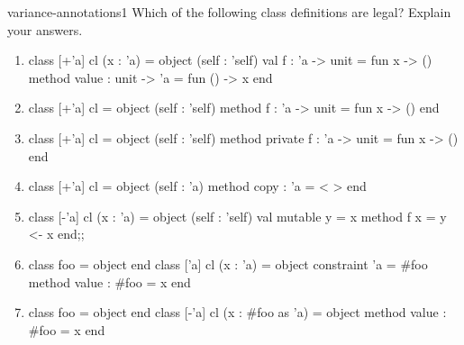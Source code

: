 \begin{exercise}{variance-annotations1}
Which of the following class definitions are legal?  Explain your answers.

\begin{enumerate}
\item

\begin{ocamllisting}
class [+'a] cl (x : 'a) =
  object (self : 'self)
    val f : 'a -> unit = fun x -> ()
    method value : unit -> 'a = fun () -> x
  end
\end{ocamllisting}

\item 

\begin{ocamllisting}
class [+'a] cl =
  object (self : 'self)
    method f : 'a -> unit = fun x -> ()
  end
\end{ocamllisting}

\item

\begin{ocamllisting}
class [+'a] cl =
  object (self : 'self)
    method private f : 'a -> unit = fun x -> ()
  end
\end{ocamllisting}

\item

\begin{ocamllisting}
class [+'a] cl =
  object (self : 'a)
    method copy : 'a = {< >}
  end
\end{ocamllisting}

\item

\begin{ocamllisting}
class [-'a] cl (x : 'a) =
  object (self : 'self)
    val mutable y = x
    method f x = y <- x
  end;;
\end{ocamllisting}

\item

\begin{ocamllisting}
class foo = object end
class ['a] cl (x : 'a) =
  object
    constraint 'a = #foo
    method value : #foo = x
  end
\end{ocamllisting}

\item

\begin{ocamllisting}
class foo = object end
class [-'a] cl (x : #foo as 'a) =
  object
    method value : #foo = x
  end
\end{ocamllisting}


\end{enumerate}
\end{exercise}
